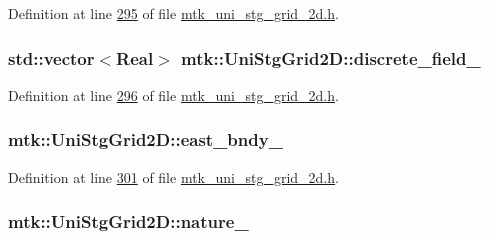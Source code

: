 Definition at line \hyperlink{mtk__uni__stg__grid__2d_8h_source_l00295}{295} of file \hyperlink{mtk__uni__stg__grid__2d_8h_source}{mtk\+\_\+uni\+\_\+stg\+\_\+grid\+\_\+2d.\+h}.

\hypertarget{classmtk_1_1UniStgGrid2D_ad7474b2669ee988b84aed20b7f5dc7be}{
\subsubsection[{discrete\+\_\+field\+\_\+}]{\setlength{\rightskip}{0pt plus 5cm}std\+::vector$<${\bf Real}$>$ mtk\+::\+Uni\+Stg\+Grid2\+D\+::discrete\+\_\+field\+\_\+\hspace{0.3cm}{\ttfamily [private]}}}\label{classmtk_1_1UniStgGrid2D_ad7474b2669ee988b84aed20b7f5dc7be}


Definition at line \hyperlink{mtk__uni__stg__grid__2d_8h_source_l00296}{296} of file \hyperlink{mtk__uni__stg__grid__2d_8h_source}{mtk\+\_\+uni\+\_\+stg\+\_\+grid\+\_\+2d.\+h}.

\hypertarget{classmtk_1_1UniStgGrid2D_ae24f3d5bf5ed3a6d066cdf48aa1fb307}{
\subsubsection[{east\+\_\+bndy\+\_\+}]{ mtk\+::\+Uni\+Stg\+Grid2\+D\+::east\+\_\+bndy\+\_\+\hspace{0.3cm}{\ttfamily [private]}}}\label{classmtk_1_1UniStgGrid2D_ae24f3d5bf5ed3a6d066cdf48aa1fb307}


Definition at line \hyperlink{mtk__uni__stg__grid__2d_8h_source_l00301}{301} of file \hyperlink{mtk__uni__stg__grid__2d_8h_source}{mtk\+\_\+uni\+\_\+stg\+\_\+grid\+\_\+2d.\+h}.

\hypertarget{classmtk_1_1UniStgGrid2D_ac8b66740d328803f7fbabd1c42c775b2}{
\subsubsection[{nature\+\_\+}]{ mtk\+::\+Uni\+Stg\+Grid2\+D\+::nature\+\_\+\hspace{0.3cm}{\ttfamily [private]}}}\label{classmtk_1_1UniStgGrid2D_ac8b66740d328803f7fbabd1c42c775b2}


